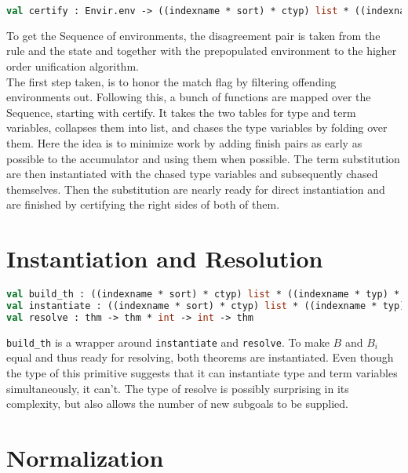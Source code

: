 \begin{lstlisting}[language=ML,breaklines=true]
val certify : Envir.env -> ((indexname * sort) * ctyp) list * ((indexname * typ) * cterm) list
\end{lstlisting}

To get the Sequence of environments, the disagreement pair is taken from the rule and the state and together with the prepopulated environment to the higher order unification algorithm.\\
The first step taken, is to honor the match flag by filtering offending environments out. Following this, a bunch of functions are mapped over the Sequence, starting with certify. It takes the two tables for type and term variables, collapses them into list, and chases the type variables by folding over them. Here the idea is to minimize work by adding finish pairs as early as possible to the accumulator and using them when possible. The term substitution are then instantiated with the chased type variables and subsequently chased themselves. Then the substitution are nearly ready for direct instantiation and are finished by certifying the right sides of both of them.\\

\section{Instantiation and Resolution}

\begin{lstlisting}[language=ML,breaklines=true]
val build_th : ((indexname * sort) * ctyp) list * ((indexname * typ) * cterm) list -> thm
val instantiate : ((indexname * sort) * ctyp) list * ((indexname * typ) * cterm) list
val resolve : thm -> thm * int -> int -> thm
\end{lstlisting}

\texttt{build\_th} is a wrapper around \texttt{instantiate} and \texttt{resolve}. To make $B$ and $B_i$ equal and thus ready for resolving, both theorems are instantiated. Even though the type of this primitive suggests that it can instantiate type and term variables simultaneously, it can't. The type of resolve is possibly surprising in its complexity, but also allows the number of new subgoals to be supplied.\\

\section{Normalization}

